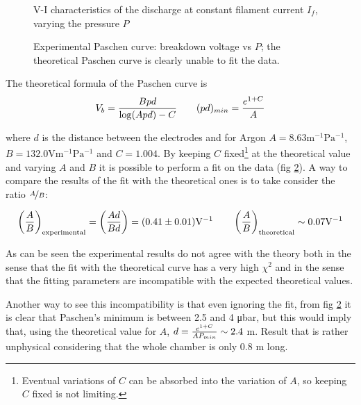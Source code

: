 \documentclass[11pt,a4 paper]{article}
\let\oldfrac\frac
\renewcommand{\frac}[3][d]{\ifthenelse{\equal{#1}{d}}{\oldfrac{#2}{#3}}{\nicefrac{#2}{#3}}}
\begin{document}
\begin{figure}[H]
  \centering
  \caption{V-I characteristics of the discharge at constant filament current $I_f$, varying the pressure $P$}
  \label{fig:constIf}
\end{figure}

\begin{figure}[H]
  \centering
  \caption{Experimental Paschen curve: breakdown voltage vs $P$; the theoretical Paschen curve is clearly unable to fit the data.}
  \label{fig:DCP}
\end{figure}

The theoretical formula of the Paschen curve is
\begin{gather} \label{eq:paschen}
  V_b = \frac{Bpd}{\log(Apd) - C} \qquad (pd)_{min} = \frac{e^{1+C}}{A}
\end{gather}

where $d$ is the distance between the electrodes and for Argon $A = 8.63 \si{\metre^{-1}\pascal^{-1}}$, $B = 132.0 \si{\volt\metre^{-1}\pascal^{-1}}$ and $C = 1.004$. By keeping $C$ fixed\footnote{Eventual variations of $C$ can be absorbed into the variation of $A$, so keeping $C$ fixed is not limiting.} at the theoretical value and varying $A$ and $B$ it is possible to perform a fit on the data (fig \ref{fig:DCP}).
A way to compare the results of the fit with the theoretical ones is to take consider the ratio $\frac[f]{A}{B}$:

\begin{gather*}
  \left( \frac{A}{B} \right)_{\text{experimental}} = \left( \frac{Ad}{Bd} \right) = (0.41 \pm 0.01) \si{\volt^{-1}} \qquad
  \left( \frac{A}{B} \right)_{\text{theoretical}} \sim 0.07 \si{\volt^{-1}}
\end{gather*}

As can be seen the experimental results do not agree with the theory both in the sense that the fit with the theoretical curve has a very high $\chi^2$ and in the sense that the fitting parameters are incompatible with the expected theoretical values.

Another way to see this incompatibility is that even ignoring the fit, from fig \ref{fig:DCP} it is clear that Paschen's minimum is between 2.5 and 4 \si{\micro\bar}, but this would imply that, using the theoretical value for $A$,  $d = \frac{e^{1+C}}{AP_{min}} \sim 2.4$ \si{\metre}. Result that is rather unphysical considering that the whole chamber is only 0.8 \si{\metre} long.
\end{document}
